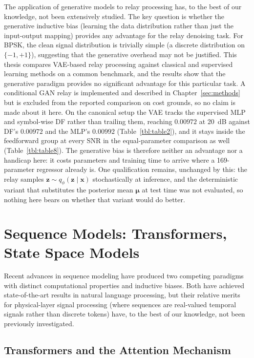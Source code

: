 The application of generative models to relay processing has, to the best of our knowledge, not been extensively studied. The key question is whether the generative inductive bias (learning the data distribution rather than just the input-output mapping) provides any advantage for the relay denoising task. For BPSK, the clean signal distribution is trivially simple (a discrete distribution on \(\{-1, +1\}\)), suggesting that the generative overhead may not be justified. This thesis compares VAE-based relay processing against classical and supervised learning methods on a common benchmark, and the results show that the generative paradigm provides no significant advantage for this particular task. A conditional GAN relay is implemented and described in Chapter~\ref{sec:methods} but is excluded from the reported comparison on cost grounds, so no claim is made about it here. On the canonical setup the VAE tracks the supervised MLP and symbol-wise DF rather than trailing them, reaching $0.00972$ at 20~dB against DF's $0.00972$ and the MLP's $0.00992$ (Table~\ref{tbl:table2}), and it stays inside the feedforward group at every SNR in the equal-parameter comparison as well (Table~\ref{tbl:table8}). The generative bias is therefore neither an advantage nor a handicap here: it costs parameters and training time to arrive where a 169-parameter regressor already is. One qualification remains, unchanged by this: the relay samples $\mathbf{z}\sim q_\phi(\mathbf{z}\mid\mathbf{x})$ stochastically at inference, and the deterministic variant that substitutes the posterior mean $\boldsymbol{\mu}$ at test time was not evaluated, so nothing here bears on whether that variant would do better.

\section{Sequence Models: Transformers, State Space Models}\label{sec:sequence-models-transformers-and-state-space-models}

Recent advances in sequence modeling have produced two competing paradigms with distinct computational properties and inductive biases. Both have achieved state-of-the-art results in natural language processing, but their relative merits for physical-layer signal processing (where sequences are real-valued temporal signals rather than discrete tokens) have, to the best of our knowledge, not been previously investigated.

\subsection{Transformers and the Attention Mechanism}\label{sec:transformers-and-the-attention-mechanism}

